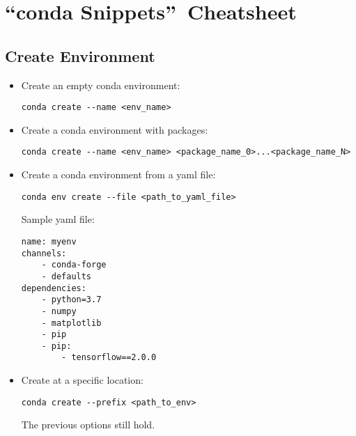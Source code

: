 \section{\textquotedblleft conda Snippets\textquotedblright\ Cheatsheet}


\subsection{Create Environment}

\begin{itemize}
    \item Create an empty conda environment:
    \begin{verbatim}
conda create --name <env_name>
    \end{verbatim}
    \item Create a conda environment with packages:
    \begin{verbatim}
conda create --name <env_name> <package_name_0>...<package_name_N>
    \end{verbatim}
    \item Create a conda environment from a yaml file:
    \begin{verbatim}
conda env create --file <path_to_yaml_file>
    \end{verbatim}
    Sample yaml file:
    \begin{verbatim}
name: myenv
channels:
    - conda-forge
    - defaults
dependencies:
    - python=3.7
    - numpy
    - matplotlib
    - pip
    - pip:
        - tensorflow==2.0.0
    \end{verbatim}
    \item Create at a specific location:
    \begin{verbatim}
conda create --prefix <path_to_env>
    \end{verbatim}
    The previous options still hold.
\end{itemize}


